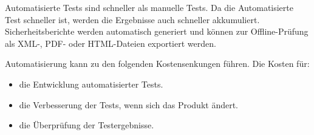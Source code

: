 Automatisierte Tests sind schneller als manuelle Tests. Da die Automatisierte Test schneller ist, werden die Ergebnisse auch schneller akkumuliert. Sicherheitsberichte werden automatisch generiert und können zur Offline-Prüfung als XML-, PDF- oder HTML-Dateien exportiert werden\cite{autovorteil99}.

Automatisierung kann zu den folgenden Kostensenkungen führen. Die Kosten für\cite{autovorteil99}: 

\begin{itemize} 
	\item die Entwicklung automatisierter Tests.
	\item die Verbesserung der Tests, wenn sich das Produkt ändert.
	\item die Überprüfung der Testergebnisse.
\end{itemize} 


















